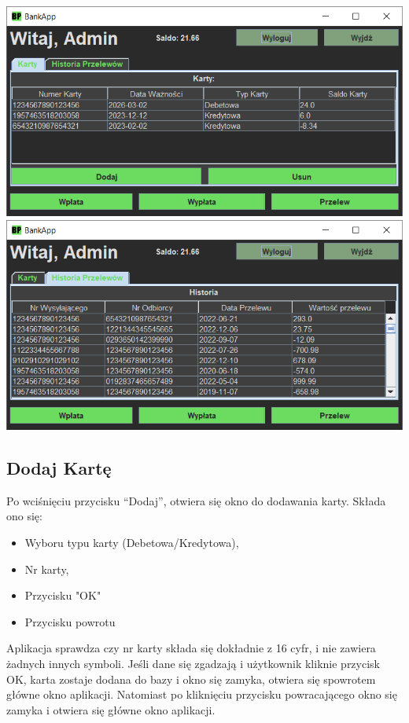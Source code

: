 \documentclass[12pt, letterpaper]{article}
\begin{document}
\begin{center}
	\includegraphics[scale=0.5]{mainkarty}
	\includegraphics[scale=0.5]{mainhistoria}
\end{center}

\subsection{Dodaj Kartę}

\quad Po wciśnięciu przycisku “Dodaj”, otwiera się okno do dodawania karty.
Składa ono się:

\begin{itemize}
\item Wyboru typu karty (Debetowa/Kredytowa),
\item Nr karty,
\item Przycisku "OK"
\item Przycisku powrotu
\end{itemize}

\quad Aplikacja sprawdza czy nr karty składa się dokładnie z 16 cyfr, i nie zawiera żadnych innych symboli. 
Jeśli dane się zgadzają i użytkownik kliknie przycisk OK, karta zostaje dodana do bazy i okno się zamyka, otwiera się spowrotem główne okno aplikacji.
Natomiast po kliknięciu przycisku powracającego okno się zamyka i otwiera się główne okno aplikacji.
\end{document}
